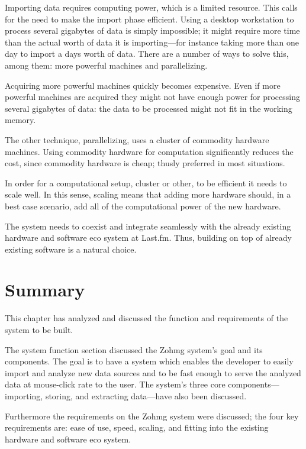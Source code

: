 Importing data requires computing power, which is a limited resource. This calls
for the need to make the import phase efficient. Using a desktop workstation to
process several gigabytes of data is simply impossible; it might require more
time than the actual worth of data it is importing---for instance taking more
than one day to import a days worth of data. There are a number of ways to solve
this, among them: more powerful machines and parallelizing.

Acquiring more powerful machines quickly becomes expensive. Even if more
powerful machines are acquired they might not have enough power for processing
several gigabytes of data: the data to be processed might not fit in the working
memory.

The other technique, parallelizing, uses a cluster of commodity hardware
machines. Using commodity hardware for computation significantly reduces the
cost, since commodity hardware is cheap; thusly preferred in most situations.

In order for a computational setup, cluster or other, to be efficient it needs
to scale well. In this sense, scaling means that adding more hardware should, in
a best case scenario, add all of the computational power of the new hardware.

The system needs to coexist and integrate seamlessly with the already existing
hardware and software eco system at Last.fm. Thus, building on top of already
existing software is a natural choice.


\section*{Summary}

This chapter has analyzed and discussed the function and requirements of the
system to be built.

The system function section discussed the Zohmg system's goal and its
components. The goal is to have a system which enables the developer to easily
import and analyze new data sources and to be fast enough to serve the analyzed
data at mouse-click rate to the user. The system's three core
components---importing, storing, and extracting data---have also been
discussed.

Furthermore the requirements on the Zohmg system were discussed; the four key
requirements are: ease of use, speed, scaling, and fitting into the existing
hardware and software eco system.



